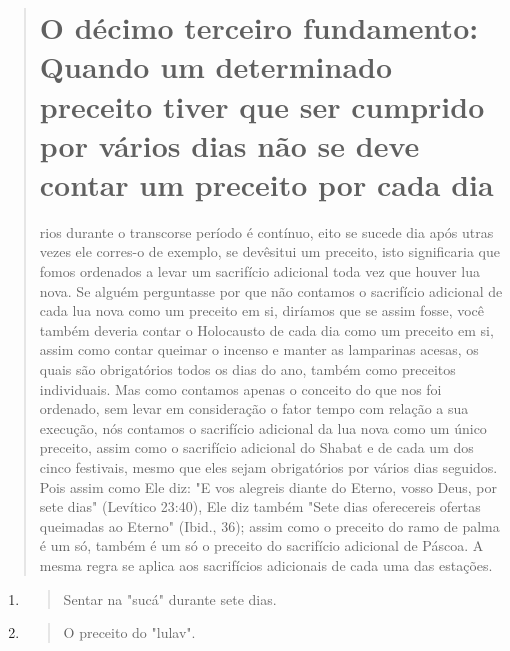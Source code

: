 \begin{quote}
\chapter{O décimo terceiro fundamento: Quando um determinado preceito tiver que ser cumprido por vários dias não se deve contar um preceito por cada dia}

rios durante o transcor­se período é contínuo, eito se sucede dia após
utras vezes ele corres-o de exemplo, se devês­itui um preceito, isto
sig­nificaria que fomos ordenados a levar um sacrifício adicional toda
vez que hou­ver lua nova. Se alguém perguntasse por que não contamos o
sacrifício adicional de cada lua nova como um preceito em si, diríamos
que se assim fosse, você tam­bém deveria contar o Holocausto de cada dia
como um preceito em si, assim como contar queimar o incenso e manter as
lamparinas acesas, os quais são obri­gatórios todos os dias do ano,
também como preceitos individuais. Mas como contamos apenas o conceito
do que nos foi ordenado, sem levar em considera­ção o fator tempo com
relação a sua execução, nós contamos o sacrifício adicio­nal da lua nova
como um único preceito, assim como o sacrifício adicional do Shabat e de
cada um dos cinco festivais, mesmo que eles sejam obrigatórios por
vários dias seguidos. Pois assim como Ele diz: "E vos alegreis diante do
Eterno, vosso Deus, por sete dias" (Levítico 23:40), Ele diz também
"Sete dias oferece­reis ofertas queimadas ao Eterno" (Ibid., 36); assim
como o preceito do ramo de palma é um só, também é um só o preceito do
sacrifício adicional de Páscoa. A mesma regra se aplica aos sacrifícios
adicionais de cada uma das estações.
\end{quote}

\begin{enumerate}
\def\labelenumi{\arabic{enumi}.}
\setcounter{enumi}{22}
\item
 \begin{quote}
 Sentar na "sucá" durante sete dias.
 \end{quote}
\item
 \begin{quote}
 O preceito do "lulav".
 \end{quote}
\end{enumerate}

